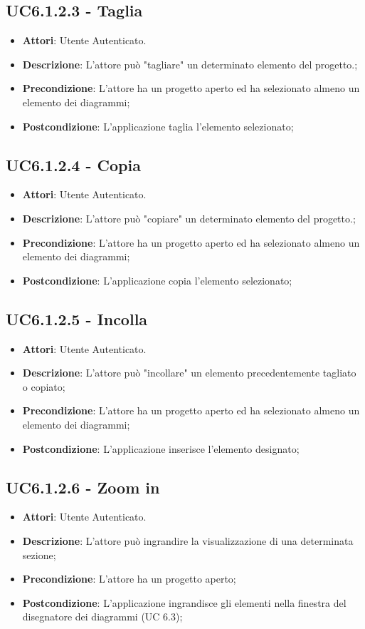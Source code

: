 \subsection{UC6.1.2.3 - Taglia} 
\label{ssec:UC6.1.2.3} 
\begin{itemize} 
\item \textbf{Attori}: Utente Autenticato.
\item \textbf{Descrizione}: L’attore può "tagliare" un determinato elemento del progetto.;
\item \textbf{Precondizione}: L’attore ha un progetto aperto ed ha selezionato almeno un elemento dei diagrammi;
\item \textbf{Postcondizione}: L’applicazione taglia l’elemento selezionato;
\end{itemize} 
\subsection{UC6.1.2.4 - Copia} 
\label{ssec:UC6.1.2.4} 
\begin{itemize} 
\item \textbf{Attori}: Utente Autenticato.
\item \textbf{Descrizione}: L’attore può "copiare" un determinato elemento del progetto.;
\item \textbf{Precondizione}: L’attore ha un progetto aperto ed ha selezionato almeno un elemento dei diagrammi;
\item \textbf{Postcondizione}: L’applicazione copia l’elemento selezionato;
\end{itemize} 
\subsection{UC6.1.2.5 - Incolla} 
\label{ssec:UC6.1.2.5} 
\begin{itemize} 
\item \textbf{Attori}: Utente Autenticato.
\item \textbf{Descrizione}: L’attore può "incollare" un elemento precedentemente tagliato o copiato;
\item \textbf{Precondizione}: L’attore ha un progetto aperto ed ha selezionato almeno un elemento dei diagrammi;
\item \textbf{Postcondizione}: L’applicazione inserisce l’elemento designato;
\end{itemize} 
\subsection{UC6.1.2.6 - Zoom in} 
\label{ssec:UC6.1.2.6} 
\begin{itemize} 
\item \textbf{Attori}: Utente Autenticato.
\item \textbf{Descrizione}: L’attore può ingrandire la visualizzazione di una determinata sezione;
\item \textbf{Precondizione}: L’attore ha un progetto aperto;
\item \textbf{Postcondizione}: L’applicazione ingrandisce gli elementi nella finestra del disegnatore dei diagrammi (UC 6.3);
\end{itemize} 
